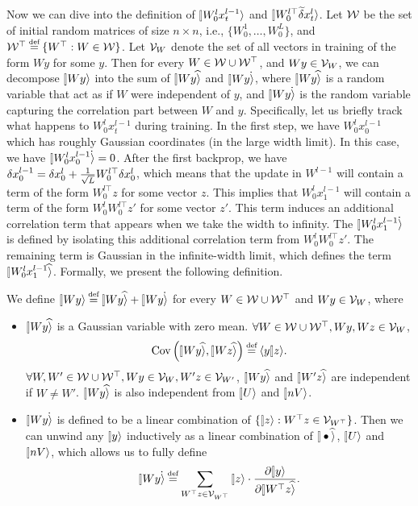 \documentclass{article}
\theoremstyle{plain}
\theoremstyle{definition}
\begin{document}
Now we can dive into the definition of $\ket{W_0^l x_t^{l-1}}$ and $\ket{W_0^{l\top} \tilde\del x_t^l}$. Let $\mathcal{W}$ be the set of initial random matrices of size $n\times n$, i.e., $\{W_0^1, \ldots, W_0^L\}$, and $\cW^\top\odefeq \{W^\top: W\in \cW\}$. Let $\mathcal{V}_W$ denote the set of all vectors in training of the form $W y$ for some $y$. Then for every $W\in \mathcal{W}\cup \mathcal{W}^\top$, and $Wy\in \mathcal{V}_W$, we can decompose $\ket{Wy}$ into the sum of $\hatket{Wy}$ and $\dotket{Wy}$, where $\hatket{Wy}$ is a random variable that act as if $W$ were independent of $y$, and $\dotket{Wy}$ is the random variable capturing the correlation part between $W$ and $y$. Specifically, let us briefly track what happens to $W^l_0 x^{l-1}_t$ during training. In the first step, we have $W^l_0 x^{l-1}_0$ which has roughly Gaussian coordinates (in the large width limit). In this case, we have $\dotket{W^l_0 x^{l-1}_0} = 0$. 
After the first backprop, we have $ \delta x^{l-1}_0 = \delta x^{l}_0 + \frac{1}{\sqrt{L}} W^{l\top}_0 \delta x^{l}_0$, which means that the update in $W^{l-1}$ will contain a term of the form $W^{l\top}_0 z$ for some vector $z$. This implies that $W^{l}_0 x^{l-1}_1$ will contain a term of the form $W^{l}_0 W^{l\top}_0 z'$ for some vector $z'$. This term induces an additional correlation term that appears when we take the width to infinity. The $\dotket{W^{l}_0 x^{l-1}_1}$ is defined by isolating this additional correlation term from $W^{l}_0 W^{l\top}_0 z'$. The remaining term is Gaussian in the infinite-width limit, which defines the term $\hatket{W^{l}_0 x^{l-1}_1}$. Formally, we present the following definition.
\begin{defn}\label{def:zhatzdot}
    
    We define $\ket{Wy} \odefeq \hatket{Wy} + \dotket{Wy}$ for every $W \in \mathcal{W}\cup \mathcal{W}^\top$ and $Wy\in \mathcal{V}_W$, where
    \begin{itemize}
        \item $\hatket{Wy}$ is a Gaussian variable with zero mean. $\forall W \in \mathcal{W}\cup \mathcal{W}^\top, Wy, Wz\in \mathcal{V}_W$,
        \[ \Cov\left(\hatket{Wy}, \hatket{Wz}\right) \odefeq \braket{y}{z}.\]
        $\forall W, W' \in \mathcal{W}\cup \mathcal{W}^\top, Wy\in \mathcal{V}_W, W'z\in \mathcal{V}_{W'}$, $\hatket{Wy}$ and $\hatket{W'z}$ are independent if $W\neq W'$.
        $\hatket{Wy}$ is also independent from $\ket{U}$ and $\ket{nV}$.
        \item $\dotket{Wy}$ is defined to be a linear combination of $\{\ket{z}: W^\top z \in \calV_{W^\top}\}$. Then we can unwind any $\ket{y}$ inductively as a linear combination of $\hatket \bullet$, $\ket{U}$ and $\ket{nV}$, which allows us to fully define 
        \[\dotket{Wy}\odefeq\sum_{W^\top z\in \calV_{W^\top}} \ket{z} \cdot \frac{\partial \ket{y}}{\partial \hatket{W^\top z}}. \]
    \end{itemize}
\end{defn}
\end{document}
